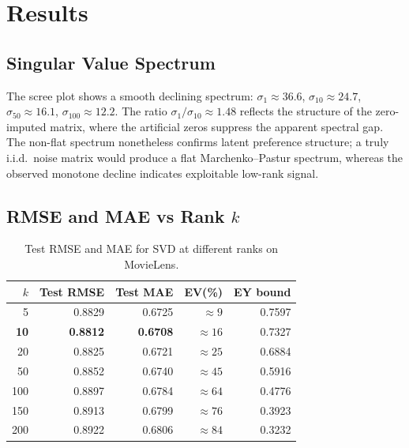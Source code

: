 \documentclass[12pt, a4paper]{article}
\begin{document}
\section{Results}
\label{sec:results}

\subsection{Singular Value Spectrum}

The scree plot shows a smooth declining spectrum: $\sigma_1 \approx 36.6$,
$\sigma_{10} \approx 24.7$, $\sigma_{50} \approx 16.1$, $\sigma_{100} \approx 12.2$.
The ratio $\sigma_1/\sigma_{10} \approx 1.48$ reflects the structure of the
zero-imputed matrix, where the artificial zeros suppress the apparent spectral
gap.  The non-flat spectrum nonetheless confirms latent preference structure;
a truly i.i.d.\ noise matrix would produce a flat Marchenko--Pastur spectrum,
whereas the observed monotone decline indicates exploitable low-rank signal.

\subsection{RMSE and MAE vs Rank $k$}

\begin{table}[h!]
\centering
\caption{Test RMSE and MAE for SVD at different ranks on MovieLens.}
\begin{tabular}{rrrrr}
\toprule
$k$ & Test RMSE & Test MAE & EV(\%) & EY bound \\
\midrule
5              & 0.8829 & 0.6725 & $\approx  9$ & 0.7597 \\
\textbf{10}    & \textbf{0.8812} & \textbf{0.6708} & $\approx 16$ & 0.7327 \\
20             & 0.8825 & 0.6721 & $\approx 25$ & 0.6884 \\
50             & 0.8852 & 0.6740 & $\approx 45$ & 0.5916 \\
100            & 0.8897 & 0.6784 & $\approx 64$ & 0.4776 \\
150            & 0.8913 & 0.6799 & $\approx 76$ & 0.3923 \\
200            & 0.8922 & 0.6806 & $\approx 84$ & 0.3232 \\
\bottomrule
\end{tabular}
\label{tab:rmse_k}
\end{table}
\end{document}
